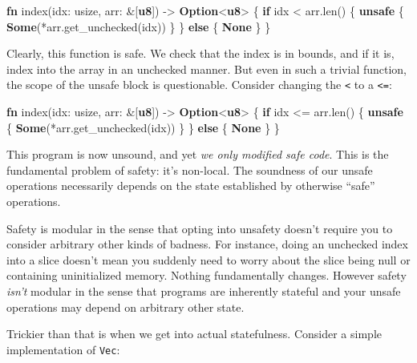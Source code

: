 \documentclass[a4paper,]{book}
\newenvironment{Shaded}{\begin{snugshade}}{\end{snugshade}}
\newcommand{\KeywordTok}[1]{\textcolor[rgb]{0.13,0.29,0.53}{\textbf{{#1}}}}
\newcommand{\NormalTok}[1]{{#1}}
\begin{document}
\begin{Shaded}
\begin{Highlighting}[]
\KeywordTok{fn} \NormalTok{index(idx: usize, arr: &[}\KeywordTok{u8}\NormalTok{]) -> }\KeywordTok{Option}\NormalTok{<}\KeywordTok{u8}\NormalTok{> \{}
    \KeywordTok{if} \NormalTok{idx < arr.len() \{}
        \KeywordTok{unsafe} \NormalTok{\{}
            \KeywordTok{Some}\NormalTok{(*arr.get_unchecked(idx))}
        \NormalTok{\}}
    \NormalTok{\} }\KeywordTok{else} \NormalTok{\{}
        \KeywordTok{None}
    \NormalTok{\}}
\NormalTok{\}}
\end{Highlighting}
\end{Shaded}

Clearly, this function is safe. We check that the index is in bounds,
and if it is, index into the array in an unchecked manner. But even in
such a trivial function, the scope of the unsafe block is questionable.
Consider changing the \texttt{\textless{}} to a \texttt{\textless{}=}:

\begin{Shaded}
\begin{Highlighting}[]
\KeywordTok{fn} \NormalTok{index(idx: usize, arr: &[}\KeywordTok{u8}\NormalTok{]) -> }\KeywordTok{Option}\NormalTok{<}\KeywordTok{u8}\NormalTok{> \{}
    \KeywordTok{if} \NormalTok{idx <= arr.len() \{}
        \KeywordTok{unsafe} \NormalTok{\{}
            \KeywordTok{Some}\NormalTok{(*arr.get_unchecked(idx))}
        \NormalTok{\}}
    \NormalTok{\} }\KeywordTok{else} \NormalTok{\{}
        \KeywordTok{None}
    \NormalTok{\}}
\NormalTok{\}}
\end{Highlighting}
\end{Shaded}

This program is now unsound, and yet \emph{we only modified safe code}.
This is the fundamental problem of safety: it's non-local. The soundness
of our unsafe operations necessarily depends on the state established by
otherwise ``safe'' operations.

Safety is modular in the sense that opting into unsafety doesn't require
you to consider arbitrary other kinds of badness. For instance, doing an
unchecked index into a slice doesn't mean you suddenly need to worry
about the slice being null or containing uninitialized memory. Nothing
fundamentally changes. However safety \emph{isn't} modular in the sense
that programs are inherently stateful and your unsafe operations may
depend on arbitrary other state.

Trickier than that is when we get into actual statefulness. Consider a
simple implementation of \texttt{Vec}:
\end{document}
